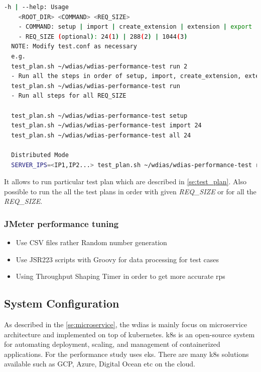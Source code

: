 \begin{lstlisting}[language=sh, caption=Test Plan Help]
-h | --help: Usage
    <ROOT_DIR> <COMMAND> <REQ_SIZE>
    - COMMAND: setup | import | create_extension | extension | export | all | query
    - REQ_SIZE (optional): 24(1) | 288(2) | 1044(3)
  NOTE: Modify test.conf as necessary
  e.g.
  test_plan.sh ~/wdias/wdias-performance-test run 2
  - Run all the steps in order of setup, import, create_extension, extension, export, all, query
  test_plan.sh ~/wdias/wdias-performance-test run
  - Run all steps for all REQ_SIZE

  test_plan.sh ~/wdias/wdias-performance-test setup
  test_plan.sh ~/wdias/wdias-performance-test import 24
  test_plan.sh ~/wdias/wdias-performance-test all 24

  Distributed Mode
  SERVER_IPS=<IP1,IP2...> test_plan.sh ~/wdias/wdias-performance-test run
\end{lstlisting}

It allows to run particular test plan which are described in \ref{se:test_plan}. Also possible to run the all the test plans in order with given \emph{REQ\_SIZE} or for all the \emph{REQ\_SIZE}.

\subsubsection{JMeter performance tuning}
\begin{itemize}
    \item Use CSV files rather Random number generation
    \item Use JSR223 scripts with Groovy for data processing for test cases
    \item Using Throughput Shaping Timer in order to get more accurate \acrshort{rps}
\end{itemize}

\subsection{System Configuration}
\label{sub:test_sys_config}
As described in the \ref{se:microservice}, the \acrshort{wdias} is mainly focus on microservice architecture and implemented on top of kubernetes. \acrfull{k8s} is an open-source system for automating deployment, scaling, and management of containerized applications. For the performance study uses \acrfull{eks}. There are many \acrshort{k8s} solutions available such as GCP, Azure, Digital Ocean etc on the cloud.

